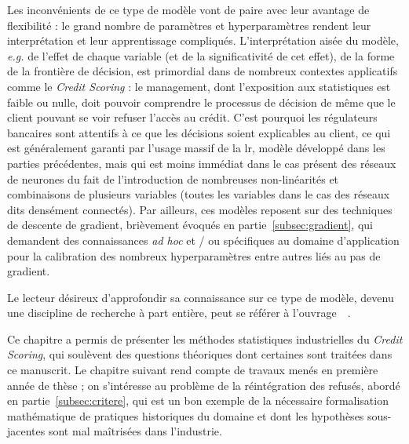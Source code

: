Les inconvénients de ce type de modèle vont de paire avec leur avantage de flexibilité : le grand nombre de paramètres et hyperparamètres rendent leur interprétation et leur apprentissage compliqués. L'interprétation aisée du modèle, \textit{e.g.} de l'effet de chaque variable (et de la significativité de cet effet), de la forme de la frontière de décision, est primordial dans de nombreux contextes applicatifs comme le \textit{Credit Scoring} : le management, dont l'exposition aux statistiques est faible ou nulle, doit pouvoir comprendre le processus de décision de même que le client pouvant se voir refuser l'accès au crédit. C'est pourquoi les régulateurs bancaires sont attentifs à ce que les décisions soient explicables au client, ce qui est généralement garanti par l'usage massif de la \gls{lr}, modèle développé dans les parties précédentes, mais qui est moins immédiat dans le cas présent des réseaux de neurones du fait de l'introduction de nombreuses non-linéarités et combinaisons de plusieurs variables (toutes les variables dans le cas des réseaux dits densément connectés). Par ailleurs, ces modèles reposent sur des techniques de descente de gradient, brièvement évoqués en partie~\ref{subsec:gradient}, qui demandent des connaissances \textit{ad hoc} et / ou spécifiques au domaine d'application pour la calibration des nombreux hyperparamètres entre autres liés au pas de gradient.

Le lecteur désireux d'approfondir sa connaissance sur ce type de modèle, devenu une discipline de recherche à part entière, peut se référer à l'ouvrage~~\cite{goodfellow2016deep}.

\bigskip

Ce chapitre a permis de présenter les méthodes statistiques industrielles du \textit{Credit Scoring}, qui soulèvent des questions théoriques dont certaines sont traitées dans ce manuscrit. Le chapitre suivant rend compte de travaux menés en première année de thèse ; on s'intéresse au problème de la réintégration des refusés, abordé en partie~\ref{subsec:critere}, qui est un bon exemple de la nécessaire formalisation mathématique de pratiques historiques du domaine et dont les hypothèses sous-jacentes sont mal maîtrisées dans l'industrie.

\printbibliography[heading=subbibliography, title=Références du chapitre 1]